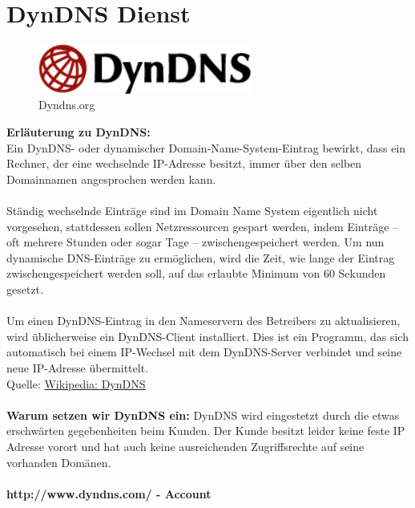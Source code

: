 \chapter{DynDNS Dienst}  %
\label{chapter:DynDNS Dienst}  %

\begin{figure}[h]
\begin{center}
   \includegraphics[width=200pt]{../bilder/dyndns.png}
   \caption{Dyndns.org}
   \label{DynDNS.org}
\end{center}
\end{figure}
\textbf{Erläuterung zu DynDNS:} \\
Ein DynDNS- oder dynamischer Domain-Name-System-Eintrag bewirkt, dass ein Rechner, der eine wechselnde IP-Adresse besitzt, immer über den selben Domainnamen angesprochen werden kann.\\
\\
Ständig wechselnde Einträge sind im Domain Name System eigentlich nicht vorgesehen, stattdessen sollen Netzressourcen gespart werden, indem Einträge – oft mehrere Stunden oder sogar Tage – zwischengespeichert werden. Um nun dynamische DNS-Einträge zu ermöglichen, wird die Zeit, wie lange der Eintrag zwischengespeichert werden soll, auf das erlaubte Minimum von 60 Sekunden gesetzt.\\
\\
Um einen DynDNS-Eintrag in den Nameservern des Betreibers zu aktualisieren, wird üblicherweise ein DynDNS-Client installiert. Dies ist ein Programm, das sich automatisch bei einem IP-Wechsel mit dem DynDNS-Server verbindet und seine neue IP-Adresse übermittelt.
\\
Quelle: \href{http://de.wikipedia.org/wiki/DynDNS}{Wikipedia: DynDNS} \\
\\
\textbf{Warum setzen wir DynDNS ein:}
DynDNS wird eingestetzt durch die etwas erschwärten gegebenheiten beim Kunden. Der Kunde besitzt leider keine feste IP Adresse vorort und hat auch keine ausreichenden Zugriffsrechte auf seine vorhanden Domänen.\\
\\
\textbf{http://www.dyndns.com/ - Account}
